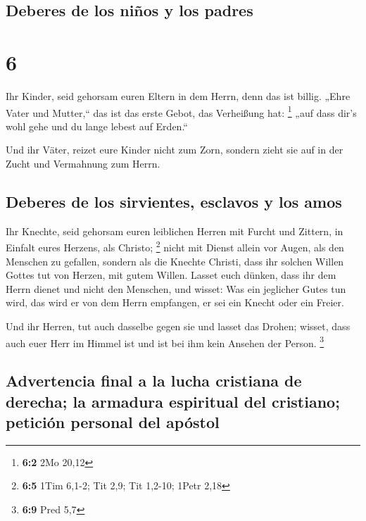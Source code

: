 \hypertarget{deberes-de-los-niuxf1os-y-los-padres}{%
\subsection{Deberes de los niños y los
padres}\label{deberes-de-los-niuxf1os-y-los-padres}}

\hypertarget{section-5}{%
\section{6}\label{section-5}}

 Ihr Kinder, seid gehorsam euren Eltern in dem Herrn, denn
das ist billig.  „Ehre Vater und Mutter,`` das ist das
erste Gebot, das Verheißung hat: \footnote{\textbf{6:2} 2Mo 20,12}
 „auf dass dir's wohl gehe und du lange lebest auf
Erden.``

 Und ihr Väter, reizet eure Kinder nicht zum Zorn, sondern
zieht sie auf in der Zucht und Vermahnung zum Herrn.

\hypertarget{deberes-de-los-sirvientes-esclavos-y-los-amos}{%
\subsection{Deberes de los sirvientes, esclavos y los
amos}\label{deberes-de-los-sirvientes-esclavos-y-los-amos}}

 Ihr Knechte, seid gehorsam euren leiblichen Herren mit
Furcht und Zittern, in Einfalt eures Herzens, als Christo; \footnote{\textbf{6:5}
  1Tim 6,1-2; Tit 2,9; Tit 1,2-10; 1Petr 2,18}  nicht mit
Dienst allein vor Augen, als den Menschen zu gefallen, sondern als die
Knechte Christi, dass ihr solchen Willen Gottes tut von Herzen, mit
gutem Willen.  Lasset euch dünken, dass ihr dem Herrn
dienet und nicht den Menschen,  und wisset: Was ein
jeglicher Gutes tun wird, das wird er von dem Herrn empfangen, er sei
ein Knecht oder ein Freier.

 Und ihr Herren, tut auch dasselbe gegen sie und lasset
das Drohen; wisset, dass auch euer Herr im Himmel ist und ist bei ihm
kein Ansehen der Person. \footnote{\textbf{6:9} Pred 5,7}

\hypertarget{advertencia-final-a-la-lucha-cristiana-de-derecha-la-armadura-espiritual-del-cristiano-peticiuxf3n-personal-del-apuxf3stol}{%
\subsection{Advertencia final a la lucha cristiana de derecha; la
armadura espiritual del cristiano; petición personal del
apóstol}\label{advertencia-final-a-la-lucha-cristiana-de-derecha-la-armadura-espiritual-del-cristiano-peticiuxf3n-personal-del-apuxf3stol}}

